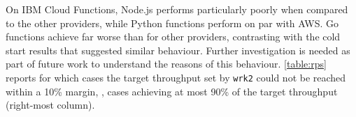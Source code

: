 On \gls{IBM} Cloud Functions, Node.js performs particularly poorly when compared to the other providers, while Python functions perform on par with \gls{AWS}.
Go functions achieve far worse than for other providers, contrasting with the cold start results that suggested similar behaviour. 
Further investigation is needed as part of future work to understand the reasons of this behaviour.
\autoref{table:rps} reports for which cases the target throughput set by \texttt{wrk2} could not be reached within a 10\% margin, \ie, cases achieving at most 90\% of the target throughput (right-most column).

